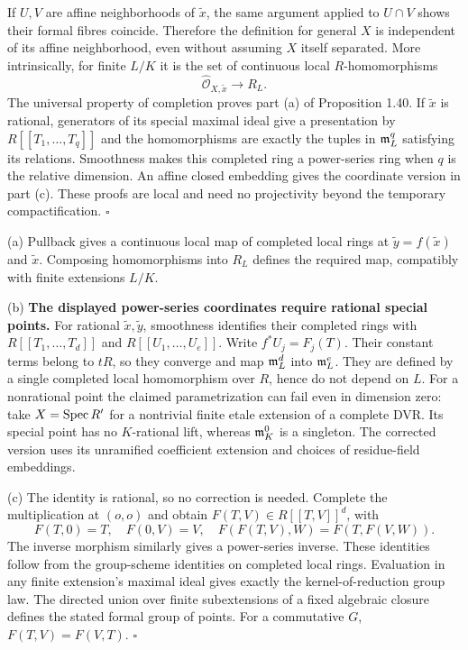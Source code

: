 \documentclass[11pt]{article}
\let\chapterexercise\exercise
\renewcommand{\exercise}[2]{\Needspace{8\baselineskip}\chapterexercise{#1}{#2}}
\begin{document}
If $U,V$ are affine neighborhoods of $\widetilde x$, the same argument applied to $U\cap V$ shows their formal fibres coincide. Therefore the definition for general $X$ is independent of its affine neighborhood, even without assuming $X$ itself separated. More intrinsically, for finite $L/K$ it is the set of continuous local $R$-homomorphisms
\[ \widehat{\mathcal O}_{X,\widetilde x}\longrightarrow R_L. \]
The universal property of completion proves part (a) of Proposition 1.40. If $\widetilde x$ is rational, generators of its special maximal ideal give a presentation by $R[[T_1,\ldots,T_q]]$ and the homomorphisms are exactly the tuples in $\mathfrak m_L^q$ satisfying its relations. Smoothness makes this completed ring a power-series ring when $q$ is the relative dimension. An affine closed embedding gives the coordinate version in part (c). These proofs are local and need no projectivity beyond the temporary compactification. \hfill$\square$

\pf (a) Pullback gives a continuous local map of completed local rings at $\widetilde y=f(\widetilde x)$ and $\widetilde x$. Composing homomorphisms into $R_L$ defines the required map, compatibly with finite extensions $L/K$.

(b) \textbf{The displayed power-series coordinates require rational special points.} For rational $\widetilde x,\widetilde y$, smoothness identifies their completed rings with $R[[T_1,\ldots,T_d]]$ and $R[[U_1,\ldots,U_e]]$. Write $f^*U_j=F_j(T)$. Their constant terms belong to $tR$, so they converge and map $\mathfrak m_L^d$ into $\mathfrak m_L^e$. They are defined by a single completed local homomorphism over $R$, hence do not depend on $L$. For a nonrational point the claimed parametrization can fail even in dimension zero: take $X=\operatorname{Spec} R'$ for a nontrivial finite etale extension of a complete DVR. Its special point has no $K$-rational lift, whereas $\mathfrak m_K^0$ is a singleton. The corrected version uses its unramified coefficient extension and choices of residue-field embeddings.

(c) The identity is rational, so no correction is needed. Complete the multiplication at $(o,o)$ and obtain $F(T,V)\in R[[T,V]]^d$, with
\[ F(T,0)=T,\quad F(0,V)=V,\quad
F(F(T,V),W)=F(T,F(V,W)). \]
The inverse morphism similarly gives a power-series inverse. These identities follow from the group-scheme identities on completed local rings. Evaluation in any finite extension's maximal ideal gives exactly the kernel-of-reduction group law. The directed union over finite subextensions of a fixed algebraic closure defines the stated formal group of points. For a commutative $G$, $F(T,V)=F(V,T)$. \hfill$\square$
\end{document}
